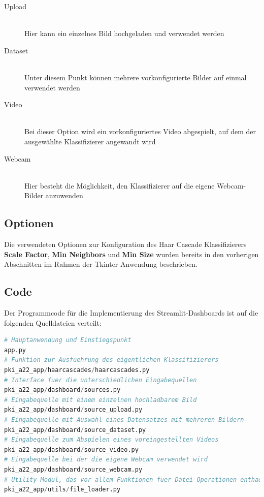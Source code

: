 \documentclass{article}
\begin{document}
\begin{description}
	\item[Upload]\hfill \\
	Hier kann ein einzelnes Bild hochgeladen und verwendet werden
	\item[Dataset]\hfill \\
	Unter diesem Punkt können mehrere vorkonfigurierte Bilder auf einmal verwendet werden
	\item[Video]\hfill \\
	Bei dieser Option wird ein vorkonfiguriertes Video abgespielt, auf dem der ausgewählte 
	Klassifizierer angewandt wird
	\item[Webcam]\hfill \\
	Hier besteht die Möglichkeit, den Klassifizierer auf die eigene Webcam-Bilder anzuwenden
\end{description}

\subsection{Optionen}
Die verwendeten Optionen zur Konfiguration des Haar Cascade Klassifizierers \textbf{Scale Factor},
\textbf{Min Neighbors} und \textbf{Min Size} wurden bereits in den vorherigen Abschnitten im Rahmen der
Tkinter Anwendung beschrieben. 

\subsection{Code}
Der Programmcode für die Implementierung des Streamlit-Dashboards ist auf die folgenden Quelldateien verteilt:

\begin{lstlisting}[language=Python]
# Hauptanwendung und Einstiegspunkt
app.py
# Funktion zur Ausfuehrung des eigentlichen Klassifizierers
pki_a22_app/haarcascades/haarcascades.py
# Interface fuer die unterschiedlichen Eingabequellen
pki_a22_app/dashboard/sources.py
# Eingabequelle mit einem einzelnen hochladbarem Bild
pki_a22_app/dashboard/source_upload.py
# Eingabequelle mit Auswahl eines Datensatzes mit mehreren Bildern
pki_a22_app/dashboard/source_dataset.py
# Eingabequelle zum Abspielen eines voreingestellten Videos
pki_a22_app/dashboard/source_video.py
# Eingabequelle bei der die eigene Webcam verwendet wird
pki_a22_app/dashboard/source_webcam.py
# Utility Modul, das vor allem Funktionen fuer Datei-Operationen enthaelt
pki_a22_app/utils/file_loader.py
\end{lstlisting}
\end{document}
